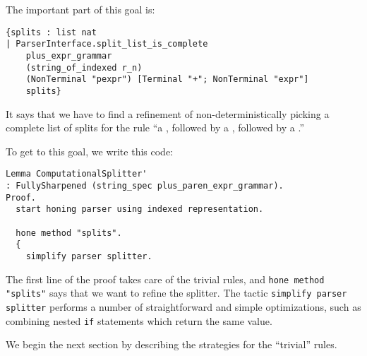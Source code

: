     The important part of this goal is:
\begin{verbatim}
{splits : list nat
| ParserInterface.split_list_is_complete
    plus_expr_grammar
    (string_of_indexed r_n)
    (NonTerminal "pexpr") [Terminal "+"; NonTerminal "expr"]
    splits}
\end{verbatim}
     It says that we have to find a refinement of non-deterministically picking a complete list of splits for the rule ``a , followed by a \terminal{+}, followed by a .''
     
     To get to this goal, we write this code:
\begin{verbatim}
Lemma ComputationalSplitter'
: FullySharpened (string_spec plus_paren_expr_grammar).
Proof.
  start honing parser using indexed representation.

  hone method "splits".
  {
    simplify parser splitter.
\end{verbatim}
      The first line of the proof takes care of the trivial rules, and \verb|hone method "splits"| says that we want to refine the splitter.  The tactic \verb|simplify parser splitter| performs a number of straightforward and simple optimizations, such as combining nested \verb|if| statements which return the same value.
      
      We begin the next section by describing the strategies for the ``trivial'' rules.
